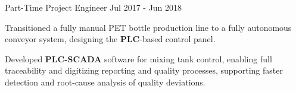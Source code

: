 \begin{cventries}

  \cventry
    {Part-Time Project Engineer} %
    {} %
    {} %
    {Jul 2017 - Jun 2018 } %
    {
      \begin{cvitems} %
        \item {Transitioned a fully manual PET bottle production line to a fully autonomous conveyor system, designing the \textbf{PLC}-based control panel.}
        \item {Developed \textbf{PLC-SCADA} software for mixing tank control, enabling full traceability and digitizing reporting and quality processes, supporting faster detection and root-cause analysis of quality deviations.}
      \end{cvitems}
    }
    \vspace{1mm}

\end{cventries}
